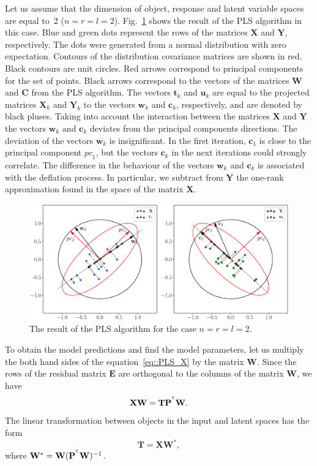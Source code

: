 \documentclass[runningheads]{llncs}
\newcommand{\bw}{\mathbf{w}}
\newcommand{\bY}{\mathbf{Y}}
\newcommand{\bX}{\mathbf{X}}
\newcommand{\bu}{\mathbf{u}}
\newcommand{\bt}{\mathbf{t}}
\newcommand{\bc}{\mathbf{c}}
\newcommand{\bP}{\mathbf{P}}
\newcommand{\bT}{\mathbf{T}}
\newcommand{\bC}{\mathbf{C}}
\newcommand{\bE}{\mathbf{E}}
\newcommand{\bW}{\mathbf{W}}
\newcommand{\T}{^{\text{\tiny\sffamily\upshape\mdseries T}}}
\begin{document}
Let us assume that the dimension of object, response and latent variable spaces are equal to~2 ($n = r = l = 2$).
Fig.~\ref{fig::PLSFigure} shows the result of the PLS algorithm in this case.
Blue and green dots represent the rows of the matrices $\bX$ and $\bY$, respectively. 
The dots were generated from a normal distribution with zero expectation. 
Contours of the distribution covariance matrices are shown in red.
Black contours are unit circles. 
Red arrows correspond to principal components for the set of points. 
Black arrows correspond to the vectors of the matrices $\bW$ and $\bC$ from the PLS algorithm. 
The vectors $\bt_k$ and $\bu_k$ are equal to the projected matrices $\bX_k$ and $\bY_k$ to the vectors $\bw_k$ and $\bc_k$, respectively, and are denoted by black pluses. 
Taking into account the interaction between the matrices $\bX$ and $\bY$ the vectors $\bw_k$ and $\bc_k$ deviates from the principal components directions. 
The deviation of the vectors $\bw_k$ is insignificant. 
In the first iteration, $\bc_1$ is close to the principal component $\textit{pc}_1$, but the vectors $\bc_k$ in the next iterations could strongly correlate. 
The difference in the behaviour of the vectors $\bw_k$ and $\bc_k$ is associated with the deflation process. In particular, we subtract from $\bY$ the one-rank approximation found in the space of the matrix $\bX$.
\begin{figure}[h]
	\centering
	\includegraphics[width=1.\linewidth]{figs/PLSFigure.eps}
	\caption{The result of the PLS algorithm for the case $n = r = l = 2$.}
	\label{fig::PLSFigure}
\end{figure}

To obtain the model predictions and find the model parameters, let us multiply the both hand sides of the equation~\eqref{eq::PLS_X} by the matrix $\bW$. Since the rows of the residual matrix  $\bE$ are orthogonal to the columns of the matrix $\bW$, we have
\[
	\bX \bW = \bT \bP^{\T} \bW.
\]
The linear transformation between objects in the input and latent spaces has the form
\begin{equation}
	\bT = \bX \bW^*,
	\label{eq::W*}
\end{equation}
where $\bW^* = \bW (\bP^{\T} \bW)^{-1}$.
\end{document}
